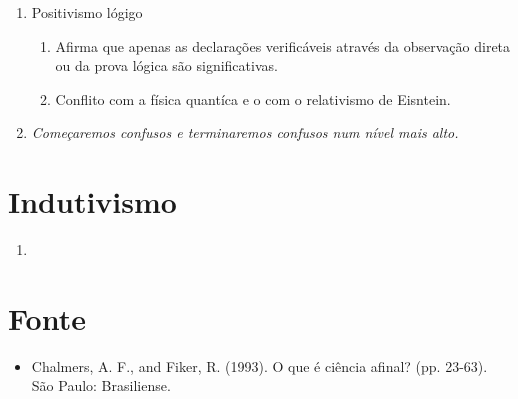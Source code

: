 \documentclass{article}
\begin{document}
\begin{enumerate}
\begin{enumerate}
    \end{enumerate}
    \item Positivismo lógigo
    \begin{enumerate}
        \item Afirma que apenas as declarações verificáveis através da observação direta ou da prova lógica são significativas.
        \item Conflito com a física quantíca e o com o relativismo de Eisntein.
    \end{enumerate}
    \item \textit{Começaremos confusos e terminaremos confusos num nível mais alto.}
\end{enumerate}

\section{Indutivismo}

\begin{enumerate}
    \item 
\end{enumerate}

\section*{Fonte}

\begin{itemize}
    \item Chalmers, A. F., and Fiker, R. (1993). O que é ciência afinal? (pp. 23-63). São Paulo: Brasiliense.
\end{itemize}

%
%
\end{document}

